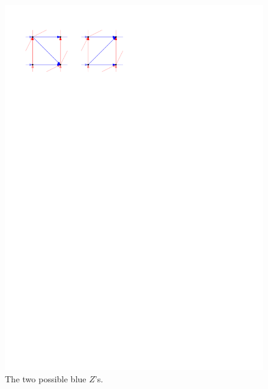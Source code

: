   \begin{figure}[!b]
    \centering
    \includegraphics[scale=1]{unifiedAlgo/img/zflip/blueZ.pdf}
    \caption{The two possible blue $Z$'s.}
    \label{fig:zflip:blueZ}

\end{figure}
